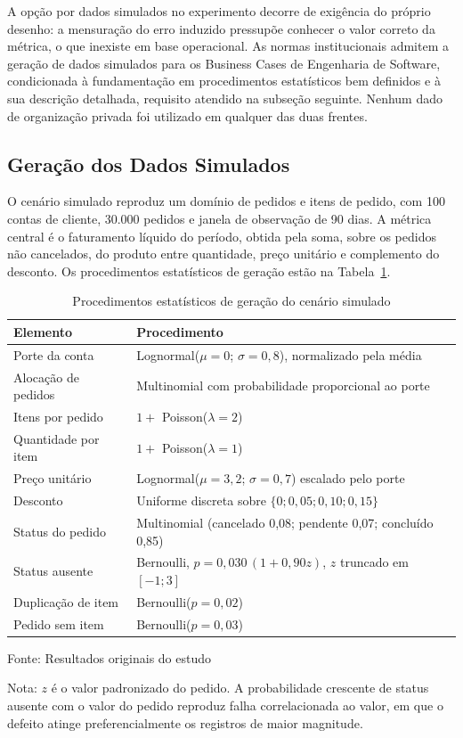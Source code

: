 \documentclass[11pt,a4paper]{article}
\newcommand{\fonteprop}[1]{%
  \par\vspace{2pt}%
  {\singlespacing\fontsize{11}{13}\selectfont\RaggedRight Fonte: #1\par}}
\newcommand{\fonteoriginal}{\fonteprop{Resultados originais do estudo}}
\newcommand{\notatab}[1]{%
  \par{\singlespacing\fontsize{11}{13}\selectfont\RaggedRight Nota: #1\par}}
\begin{document}
A opção por dados simulados no experimento decorre de exigência do próprio
desenho: a mensuração do erro induzido pressupõe conhecer o valor correto
da métrica, o que inexiste em base operacional. As normas institucionais
admitem a geração de dados simulados para os Business Cases de Engenharia
de Software, condicionada à fundamentação em procedimentos estatísticos
bem definidos e à sua descrição detalhada, requisito atendido na subseção
seguinte. Nenhum dado de organização privada foi utilizado em qualquer das
duas frentes.

\subsection{Geração dos Dados Simulados}

O cenário simulado reproduz um domínio de pedidos e itens de pedido, com
100 contas de cliente, 30.000 pedidos e janela de observação de 90 dias.
A métrica central é o faturamento líquido do período, obtida pela soma,
sobre os pedidos não cancelados, do produto entre quantidade, preço
unitário e complemento do desconto. Os procedimentos estatísticos de
geração estão na Tabela~\ref{tab:geracao}.

\begin{table}[htbp]
\centering
\caption{Procedimentos estatísticos de geração do cenário simulado}
\label{tab:geracao}
\begin{singlespace}
\begin{tabular}{@{}ll@{}}
\toprule
\textbf{Elemento} & \textbf{Procedimento} \\
\midrule
Porte da conta        & Lognormal($\mu=0$; $\sigma=0,8$), normalizado pela média \\
Alocação de pedidos   & Multinomial com probabilidade proporcional ao porte \\
Itens por pedido      & $1 + $ Poisson($\lambda=2$) \\
Quantidade por item   & $1 + $ Poisson($\lambda=1$) \\
Preço unitário        & Lognormal($\mu=3,2$; $\sigma=0,7$) escalado pelo porte \\
Desconto              & Uniforme discreta sobre $\{0; 0,05; 0,10; 0,15\}$ \\
Status do pedido      & Multinomial (cancelado 0,08; pendente 0,07; concluído 0,85) \\
Status ausente        & Bernoulli, $p = 0,030\,(1 + 0,90z)$, $z$ truncado em $[-1;3]$ \\
Duplicação de item    & Bernoulli($p=0,02$) \\
Pedido sem item       & Bernoulli($p=0,03$) \\
\bottomrule
\end{tabular}
\end{singlespace}
\fonteoriginal
\notatab{$z$ é o valor padronizado do pedido. A probabilidade crescente de
status ausente com o valor do pedido reproduz falha correlacionada ao
valor, em que o defeito atinge preferencialmente os registros de maior
magnitude.}
\end{table}
\end{document}
